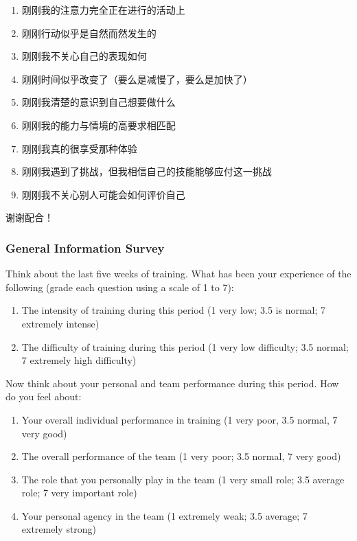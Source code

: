 \begin{CJK}{UTF8}{gbsn}
  \begin{enumerate}
    \item 刚刚我的注意力完全正在进行的活动上
    \item 刚刚行动似乎是自然而然发生的
    \item 刚刚我不关心自己的表现如何
    \item 刚刚时间似乎改变了（要么是减慢了，要么是加快了）
    \item 刚刚我清楚的意识到自己想要做什么
    \item 刚刚我的能力与情境的高要求相匹配
    \item 刚刚我真的很享受那种体验
    \item 刚刚我遇到了挑战，但我相信自己的技能能够应付这一挑战
    \item 刚刚我不关心别人可能会如何评价自己
  \end{enumerate}

    谢谢配合！





        \subsubsection{General Information Survey \label{sect:generalSurvey}}


  Think about the last five weeks of training.  What has been your experience of the following (grade each question using a scale of 1 to 7):

\begin{enumerate}
  \item The intensity of training during this period (1 very low; 3.5 is normal; 7 extremely intense)
  \item The difficulty of training during this period (1 very low difficulty; 3.5 normal; 7 extremely high difficulty)
\end{enumerate}

Now think about your personal and team performance during this period.  How do you feel about:

\begin{enumerate}
  \item Your overall individual performance in training (1 very poor, 3.5 normal, 7 very good)
  \item The overall performance of the team (1 very poor; 3.5 normal, 7 very good)
  \item The role that you personally play in the team (1 very small role; 3.5 average role; 7 very important role)
  \item  Your personal agency in the team (1 extremely weak;  3.5 average; 7 extremely strong)
\end{enumerate}



\end{CJK}
